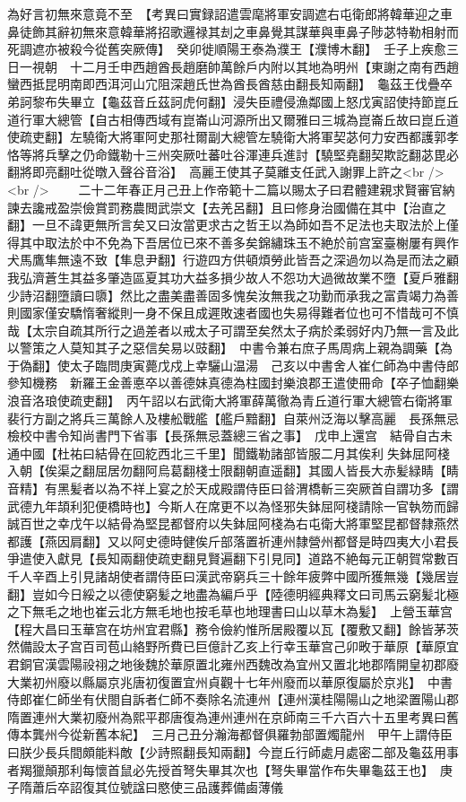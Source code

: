 為好言初無來意竟不至　【考異曰實録詔遣雲麾將軍安調遮右屯衛郎將韓華迎之車鼻徒飾其辭初無來意韓華將招歌邏禄其刦之車鼻覺其謀華與車鼻子陟苾特勒相射而死調遮亦被殺今從舊突厥傳】　癸卯徙順陽王泰為濮王【濮博木翻】　壬子上疾愈三日一視朝　十二月壬申西趙酋長趙磨帥萬餘戶内附以其地為明州【東謝之南有西趙蠻西抵昆明南即西洱河山宂阻深趙氏世為酋長酋慈由翻長知兩翻】　龜茲王伐疊卒弟訶黎布失畢立【龜茲音丘茲訶虎何翻】浸失臣禮侵漁鄰國上怒戊寅詔使持節崑丘道行軍大總管【自古相傳西域有崑崙山河源所出又爾雅曰三城為崑崙丘故曰崑丘道使疏吏翻】左驍衛大將軍阿史那社爾副大總管左驍衛大將軍契苾何力安西都護郭孝恪等將兵擊之仍命鐵勒十三州突厥吐蕃吐谷渾連兵進討【驍堅堯翻契欺訖翻苾毘必翻將即亮翻吐從暾入聲谷音浴】　高麗王使其子莫離支任武入謝罪上許之<br />
<br />
　　二十二年春正月己丑上作帝範十二篇以賜太子曰君體建親求賢審官納諫去讒戒盈崇儉賞罰務農閲武崇文【去羌呂翻】且曰修身治國備在其中【治直之翻】一旦不諱更無所言矣又曰汝當更求古之哲王以為師如吾不足法也夫取法於上僅得其中取法於中不免為下吾居位已來不善多矣錦繡珠玉不絶於前宫室臺榭屢有興作犬馬鷹隼無遠不致【隼息尹翻】行遊四方供頓煩勞此皆吾之深過勿以為是而法之顧我弘濟蒼生其益多肇造區夏其功大益多損少故人不怨功大過微故業不墮【夏戶雅翻少詩沼翻墮讀曰隳】然比之盡美盡善固多愧矣汝無我之功勤而承我之富貴竭力為善則國家僅安驕惰奢縱則一身不保且成遲敗速者國也失易得難者位也可不惜哉可不慎哉【太宗自疏其所行之過差者以戒太子可謂至矣然太子病於柔弱好内乃無一言及此以警策之人莫知其子之惡信矣易以豉翻】　中書令兼右庶子馬周病上親為調藥【為于偽翻】使太子臨問庚寅薨戊戍上幸驪山温湯　己亥以中書舍人崔仁師為中書侍郎參知機務　新羅王金善悳卒以善德妹真德為柱國封樂浪郡王遣使冊命【卒子恤翻樂浪音洛琅使疏吏翻】　丙午詔以右武衛大將軍薛萬徹為青丘道行軍大總管右衛將軍裴行方副之將兵三萬餘人及樓舩戰艦【艦戶黯翻】自萊州泛海以擊高麗　長孫無忌檢校中書令知尚書門下省事【長孫無忌蓋總三省之事】　戊申上還宫　結骨自古未通中國【杜祐曰結骨在回紇西北三千里】聞鐵勒諸部皆服二月其俟利失鉢屈阿棧入朝【俟渠之翻屈居勿翻阿烏葛翻棧士限翻朝直遥翻】其國人皆長大赤髪緑睛【睛音精】有黑髪者以為不祥上宴之於天成殿謂侍臣曰㫺渭橋斬三突厥首自謂功多【謂武德九年頡利犯便橋時也】今斯人在席更不以為怪邪失鉢屈阿棧請除一官執笏而歸誠百世之幸戊午以結骨為堅昆都督府以失鉢屈阿棧為右屯衛大將軍堅昆都督隸燕然都護【燕因肩翻】又以阿史德時健俟斤部落置祈連州隸營州都督是時四夷大小君長爭遣使入獻見【長知兩翻使疏吏翻見賢遍翻下引見同】道路不絶每元正朝賀常數百千人辛酉上引見諸胡使者謂侍臣曰漢武帝窮兵三十餘年疲弊中國所獲無幾【幾居豈翻】豈如今日綏之以德使窮髪之地盡為編戶乎【陸德明經典釋文曰司馬云窮髪北極之下無毛之地也崔云北方無毛地也按毛草也地理書曰山以草木為髪】　上營玉華宫【程大昌曰玉華宫在坊州宜君縣】務令儉約惟所居殿覆以瓦【覆敷又翻】餘皆茅茨然備設太子宫百司苞山絡野所費已巨億計乙亥上行幸玉華宫己卯畋于華原【華原宜君銅官漢雲陽祋祤之地後魏於華原置北雍州西魏改為宜州又置北地郡隋開皇初郡廢大業初州廢以縣屬京兆唐初復置宜州貞觀十七年州廢而以華原復屬於京兆】　中書侍郎崔仁師坐有伏閤自訴者仁師不奏除名流連州【連州漢桂陽陽山之地梁置陽山郡隋置連州大業初廢州為熙平郡唐復為連州連州在京師南三千六百六十五里考異曰舊傳本龔州今從新舊本紀】　三月己丑分瀚海都督俱羅勃部置燭龍州　甲午上謂侍臣曰朕少長兵間頗能料敵【少詩照翻長知兩翻】今崑丘行師處月處密二部及龜茲用事者羯獵顛那利每懷首鼠必先授首弩失畢其次也【弩失畢當作布失畢龜茲王也】　庚子隋蕭后卒詔復其位號諡曰愍使三品護葬備鹵薄儀